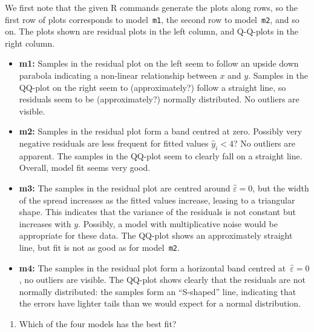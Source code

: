 \documentclass[
  a4paper,
]{article}
\providecommand{\tightlist}{%
  \setlength{\itemsep}{0pt}\setlength{\parskip}{0pt}}
\theoremstyle{definition}
\theoremstyle{definition}
\theoremstyle{definition}
\theoremstyle{definition}
\theoremstyle{remark}
\begin{document}
\begin{myanswers}

We first note that the given R commands generate the plots along
rows, so the first row of plots corresponds to model~\texttt{m1}, the
second row to model~\texttt{m2}, and so on. The plots shown are
residual plots in the left column, and Q-Q-plots in the right
column.

\begin{itemize}
\tightlist
\item
  \textbf{m1:} Samples in the residual plot on the left
  seem to follow an upside down parabola indicating a non-linear
  relationship between \(x\) and \(y\). Samples in the QQ-plot on the
  right seem to (approximately?) follow a straight line, so
  residuals seem to be (approximately?) normally distributed. No
  outliers are visible.
\item
  \textbf{m2:} Samples in the residual plot form a band
  centred at zero. Possibly very negative residuals are less
  frequent for fitted values \(\hat y_i < 4\)? No outliers are
  apparent. The samples in the QQ-plot seem to clearly fall on a
  straight line. Overall, model fit seems very good.
\item
  \textbf{m3:} The samples in the residual plot are
  centred around \(\hat\varepsilon= 0\), but the width of the spread
  increases as the fitted values increase, leasing to a triangular
  shape. This indicates that the variance of the residuals is not
  constant but increases with \(y\). Possibly, a model with
  multiplicative noise would be appropriate for these data. The
  QQ-plot shows an approximately straight line, but fit is not as
  good as for model~\texttt{m2}.
\item
  \textbf{m4:} The samples in the residual plot form a
  horizontal band centred at~\(\hat\varepsilon= 0\), no outliers are
  visible. The QQ-plot shows clearly that the residuals are not
  normally distributed: the samples form an ``S-shaped'' line,
  indicating that the errors have lighter tails than we would expect
  for a normal distribution.
\end{itemize}

\end{myanswers}

\begin{enumerate}
\def\labelenumi{\alph{enumi}.}
\setcounter{enumi}{1}
\tightlist
\item
  Which of the four models has the best fit?
\end{enumerate}
\end{document}
